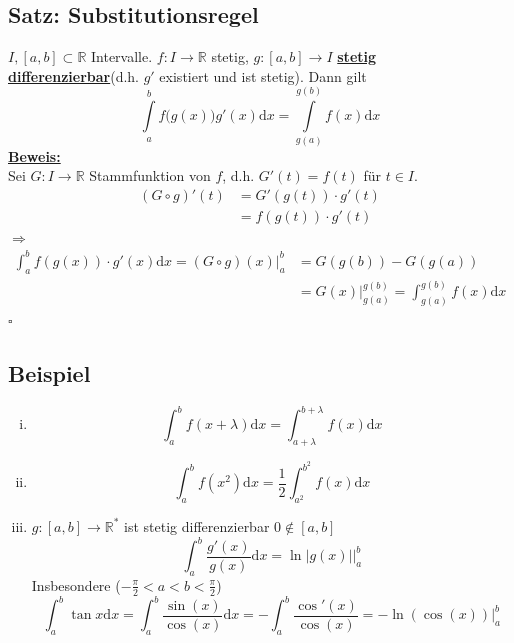 \subsection{Satz: Substitutionsregel} %
\label{sub:satz_substitutionsregel}
$I, [a,b] \subset \mathds{R}$ Intervalle. $f: I \to \mathds{R}$ stetig, $g : [a,b] \to I$ \underline{\textbf{stetig differenzierbar}}(d.h. $g'$ existiert und ist
stetig). Dann gilt
\[
	\int\limits_{a}^{b} \! f \big( g(x) \big) g'(x)  \mathrm{d}x = \int\limits_{g(a)}^{g(b)} \! f(x)  \mathrm{d}x 
\]
\underline{\textbf{Beweis:}} \\
Sei $G : I \to \mathds{R}$ Stammfunktion von $f$, d.h. $G'(t)=f(t)$ für $t \in I$.
\begin{align*}
	(G \circ g)'(t) &= G'(g(t)) \cdot g'(t) \tag{Kettenregel} \\
	&= f(g(t)) \cdot g'(t)
\end{align*}
$\Rightarrow$ 
\begin{align*}
	\int_{a} ^{b} \! f( g(x) ) \cdot g'(x) \mathrm{d}x = (G \circ g) (x) \Big|_a^b 
	&= G(g(b))- G(g(a)) \\ &= G(x) \Big|_{g(a)}^{g(b)} = \int_{g(a)} ^{g(b)} \! f(x)  \mathrm{d}x 
\end{align*}
\hfill \( \square \)

\subsection{Beispiel} %
\label{sub:beispiel}
\begin{enumerate}[(i)]
	\item \[
		\int_{a} ^{b} \! f(x+ \lambda )  \mathrm{d}x  = \int_{a+ \lambda } ^{b+ \lambda} \! f(x)  \mathrm{d}x  
	\]
	\item \[
		\int_{a} ^{b} \!  f(x^2)  \mathrm{d}x =  \frac{1}{2} \int_{a^2} ^{b^2} \! f(x)  \mathrm{d}x \tag{$g(x)= x^2$}
	\]
	\item $g : [a,b] \to \mathds{R}^*$ ist stetig differenzierbar $0 \not\in [a,b]$
	\[
		\int_{a} ^{b} \! \frac{g'(x)}{g(x)}  \mathrm{d}x  = \ln |g(x)| \Big|_a^b 
	\]
	Insbesondere ($- \frac{\pi}{2} < a <b < \frac{\pi}{2}$)
	\[
		\int_{a} ^{b} \! \tan x  \mathrm{d}x = \int_{a} ^{b} \! \frac{\sin (x)}{\cos (x)}  \mathrm{d}x = - \int_{a} ^{b} \! \frac{\cos' (x)}{\cos (x)} =
		 - \ln  (\cos (x)) \Big|_a^b
	\]
\end{enumerate}

